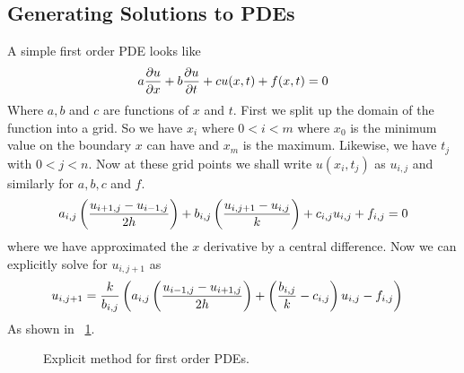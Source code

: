 \subsection{Generating Solutions to PDEs}

A simple first order PDE looks like
\begin{align*}
    a\frac{\partial u}{\partial x}+b\frac{\partial u}{\partial t}+cu(x, t)+ f(x, t) = 0
\end{align*}
Where $a, b$ and $c$ are functions of $x$ and $t$. First we split up
the domain of the function into a grid. So we have $x_i$ where
$0<i<m$ where $x_0$ is the minimum value on the boundary $x$ can
have and $x_m$ is the maximum. Likewise, we have $t_j$ with $0<j<n$.
Now at these grid points we shall write $u(x_i, t_j)$ as $u_{i,
    j}$ and similarly for $a, b, c$ and $f$.
\begin{align}\label{eqn:ex1}
    a_{i, j}\left(\frac{u_{i+1, j} - u_{i-1, j}}{2h}\right) +  b_{i,
        j}\left(\frac{u_{i, j+1} - u_{i, j}}{k}\right) + c_{i, j}u_{i, j}
    + f_{i, j} = 0
\end{align}
where we have approximated the $x$ derivative by a central
difference.
Now we can explicitly solve for $u_{i, j+1}$ as
\begin{align*}
    u_{i, j+1} & = \frac{k}{b_{i, j}}\left(a_{i, j}\left(\frac{u_{i-1, j} - u_{i+1,
                    j}}{2h}\right) + \left(\frac{b_{i, j}}{k} - c_{i,
                j}\right)u_{i, j} - f_{i, j}\right)
\end{align*}
As shown in ~\ref{fig:stencil}.
\begin{figure}
    \begin{center}
    \end{center}
    \caption{Explicit method for first order PDEs.}
    \label{fig:stencil}
\end{figure}
\medskip

